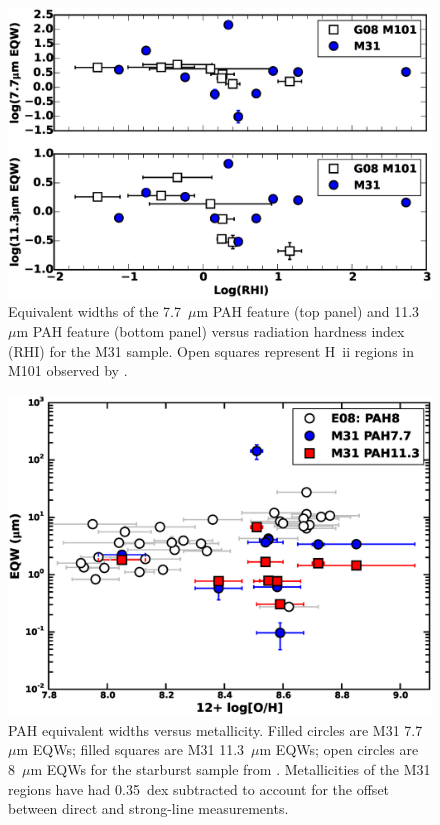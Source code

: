 \begin{figure}
\centering
\includegraphics[scale=0.30]{./fig11_new.eps}
\caption{Equivalent widths of the 7.7~$\mu$m PAH feature (top panel) and 11.3~$\mu$m PAH feature (bottom panel) versus 
radiation hardness index (RHI) for the M31 sample. Open squares represent H~{\sc ii} regions in M101 observed  by \citet{Gordon:2008lr}.  
}
\label{gordII}
\end{figure}

\begin{figure}
\centering
\includegraphics[scale=0.32]{./fig12_new.eps}
\caption{ PAH equivalent widths versus metallicity. 
Filled circles are M31 7.7~$\mu$m EQWs; filled squares are M31 11.3~$\mu$m EQWs; 
open circles are 8~$\mu$m EQWs for the starburst sample from \citet{Engelbracht_2008}.
Metallicities of the M31 regions have had 0.35~dex subtracted to account for the offset  between direct and strong-line measurements. 
}
\label{metalicityVseqw}
\end{figure}

